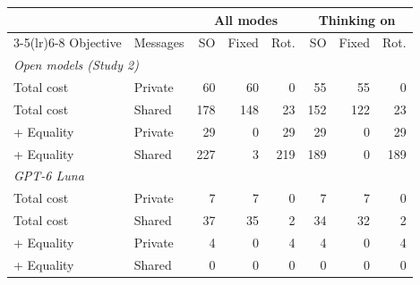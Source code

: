 \begin{tabular}{llrrrrrr}
\toprule
 & & \multicolumn{3}{c}{All modes} & \multicolumn{3}{c}{Thinking on} \\
\cmidrule(lr){3-5}\cmidrule(lr){6-8}
Objective & Messages & SO & Fixed & Rot. & SO & Fixed & Rot. \\
\midrule
\multicolumn{8}{l}{\textit{Open models (Study 2)}} \\
Total cost & Private & 60 & 60 & 0 & 55 & 55 & 0 \\
Total cost & Shared & 178 & 148 & 23 & 152 & 122 & 23 \\
+ Equality & Private & 29 & 0 & 29 & 29 & 0 & 29 \\
+ Equality & Shared & 227 & 3 & 219 & 189 & 0 & 189 \\
\midrule
\multicolumn{8}{l}{\textit{GPT-6 Luna}} \\
Total cost & Private & 7 & 7 & 0 & 7 & 7 & 0 \\
Total cost & Shared & 37 & 35 & 2 & 34 & 32 & 2 \\
+ Equality & Private & 4 & 0 & 4 & 4 & 0 & 4 \\
+ Equality & Shared & 0 & 0 & 0 & 0 & 0 & 0 \\
\bottomrule
\end{tabular}
